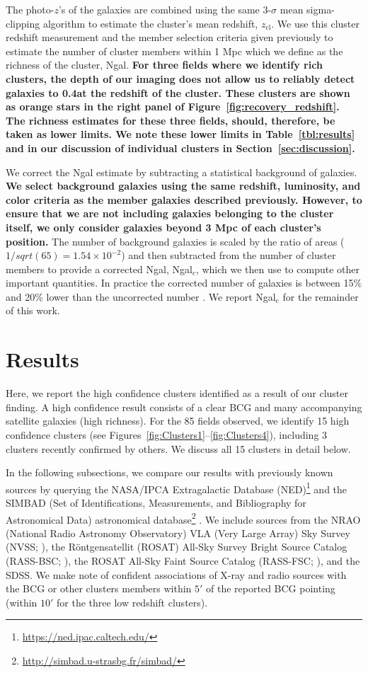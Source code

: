 \documentclass[apj, revtex4-1]{emulateapj}
\begin{document}
 The photo-$z$'s of the galaxies are combined using the same 3-$\sigma$ mean sigma-clipping algorithm to estimate the cluster's mean redshift, $z_\mathrm{cl}$. We use this cluster redshift measurement and the member selection criteria given previously to estimate the number of cluster members within 1 Mpc which we define as the richness  of the cluster, Ngal. \textbf{For three fields where we identify rich clusters, the depth of our imaging does not allow us to reliably detect galaxies to 0.4\lstar at the redshift of the cluster. These clusters are shown as orange stars in the right panel of Figure~\ref{fig:recovery_redshift}. The richness estimates for these three fields, should, therefore, be taken as lower limits. We note these lower limits in Table~\ref{tbl:results} and in our discussion of individual clusters in Section~\ref{sec:discussion}.}

We correct the Ngal estimate by subtracting a statistical background of galaxies. \textbf{We select background galaxies using the same redshift, luminosity, and color criteria as the member galaxies described previously. However, to ensure that we are not including galaxies belonging to the cluster itself, we only consider galaxies beyond 3 Mpc of each cluster's position.} The number of background galaxies is scaled by the ratio of areas ($1/sqrt(65)=1.54\times 10^{-2}$) and then subtracted  from the number of cluster members to provide a corrected Ngal, Ngal$_c$, which we then use to compute other important quantities. In practice the corrected number of galaxies is between 15\% and 20\% lower than the uncorrected number \citep{Menanteau2010}. We report Ngal$_\mathrm{c}$ for the remainder of this work.

\section{Results}\label{sec:results}
Here, we report the high confidence clusters identified as a result of our cluster finding. A high confidence result consists of a clear BCG and many accompanying satellite galaxies (high richness). For the 85 fields observed, we identify 15 high confidence clusters (see Figures~\ref{fig:Clusters1}--\ref{fig:Clusters4}), including 3 clusters recently confirmed by others. We discuss all 15 clusters in detail below.

In the following subsections, we compare our results with previously known sources by querying the NASA/IPCA Extragalactic Database (NED)\footnote{\url{https://ned.ipac.caltech.edu/}} and the SIMBAD (Set of Identifications, Measurements, and Bibliography for Astronomical Data) astronomical database\footnote{\url{http://simbad.u-strasbg.fr/simbad/}} \citep{Wenger2000}. We include sources from the NRAO (National Radio Astronomy Observatory) VLA (Very Large Array) Sky Survey (NVSS; \citealt{Condon1998}), the R\"{o}ntgensatellit (ROSAT) All-Sky Survey Bright Source Catalog (RASS-BSC; \citealt{Voges1999a}), the ROSAT All-Sky Faint Source Catalog (RASS-FSC; \citealt{Voges2000}), and the SDSS. We make note of confident associations of X-ray and radio sources with the BCG or other clusters members within $5'$ of the reported BCG pointing (within $10'$ for the three low redshift clusters).
\end{document}
